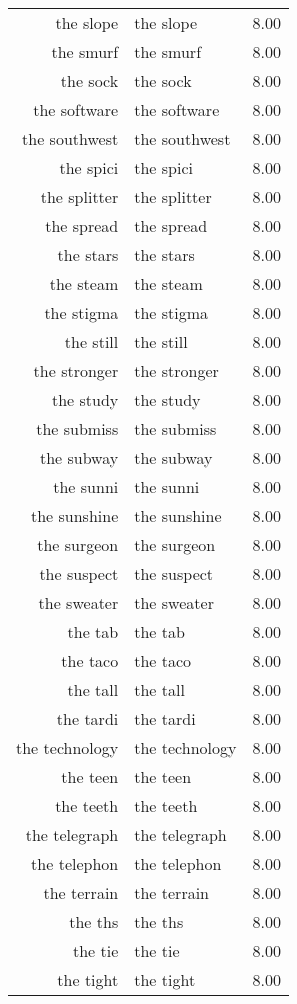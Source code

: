 \begin{table}[ht]
\begin{tabular}{rlr}
  the slope & the slope & 8.00 \\ 
  the smurf & the smurf & 8.00 \\ 
  the sock & the sock & 8.00 \\ 
  the software & the software & 8.00 \\ 
  the southwest & the southwest & 8.00 \\ 
  the spici & the spici & 8.00 \\ 
  the splitter & the splitter & 8.00 \\ 
  the spread & the spread & 8.00 \\ 
  the stars & the stars & 8.00 \\ 
  the steam & the steam & 8.00 \\ 
  the stigma & the stigma & 8.00 \\ 
  the still & the still & 8.00 \\ 
  the stronger & the stronger & 8.00 \\ 
  the study & the study & 8.00 \\ 
  the submiss & the submiss & 8.00 \\ 
  the subway & the subway & 8.00 \\ 
  the sunni & the sunni & 8.00 \\ 
  the sunshine & the sunshine & 8.00 \\ 
  the surgeon & the surgeon & 8.00 \\ 
  the suspect & the suspect & 8.00 \\ 
  the sweater & the sweater & 8.00 \\ 
  the tab & the tab & 8.00 \\ 
  the taco & the taco & 8.00 \\ 
  the tall & the tall & 8.00 \\ 
  the tardi & the tardi & 8.00 \\ 
  the technology & the technology & 8.00 \\ 
  the teen & the teen & 8.00 \\ 
  the teeth & the teeth & 8.00 \\ 
  the telegraph & the telegraph & 8.00 \\ 
  the telephon & the telephon & 8.00 \\ 
  the terrain & the terrain & 8.00 \\ 
  the ths & the ths & 8.00 \\ 
  the tie & the tie & 8.00 \\ 
  the tight & the tight & 8.00 \\ 

\end{tabular}
\end{table}
